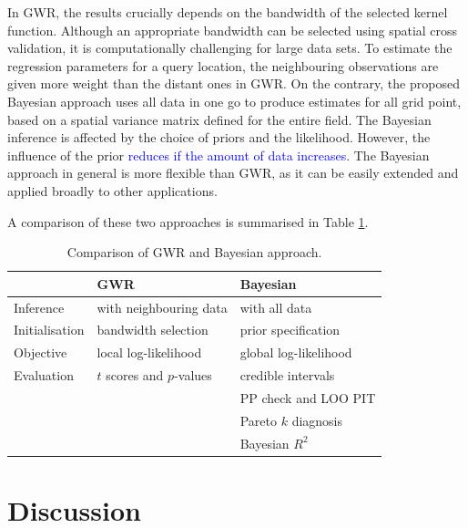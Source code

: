 \documentclass[a4paper]{article}   	%
\begin{document}
	
	In GWR, the results crucially depends on the bandwidth of the selected kernel function. Although an appropriate bandwidth can be selected using spatial cross validation, it is computationally challenging for large data sets. To estimate the regression parameters for a query location, the neighbouring observations are given more weight than the distant ones in GWR. On the contrary, the proposed Bayesian approach uses all data in one go to produce estimates for all grid point, based on a spatial variance matrix defined for the entire field. The Bayesian inference is affected by the choice of priors and the likelihood. However, the influence of the prior \textcolor{blue}{reduces if the amount of data increases}. The Bayesian approach in general is more flexible than GWR, as it can be easily extended and applied broadly to other applications. 
	
	
	A comparison of these two approaches is summarised in Table \ref{tb:compareGWR}. 
	\begin{table}[!htp]
		\centering
		\begin{tabular}{*{3}{l}} \toprule
			& GWR & Bayesian \\ \midrule
			Inference	& with neighbouring data & with all data \\ 	 
			Initialisation	& bandwidth selection &  prior specification \\ 	
			Objective	& local log-likelihood & global log-likelihood \\  \midrule
			Evaluation	&  $t$ scores and $p$-values & credible intervals \\
			&  & PP check and LOO PIT \\
			&  & Pareto $k$ diagnosis \\
			&  & Bayesian $R^2$ \\ 
			\bottomrule
		\end{tabular}
		\caption{Comparison of GWR and Bayesian approach.}\label{tb:compareGWR}
	\end{table}
	
	
	\section{Discussion}
	
\end{document}
